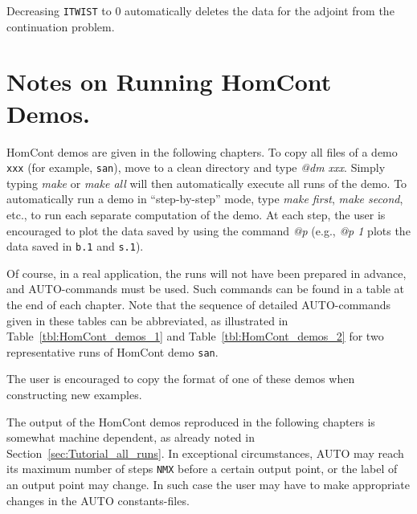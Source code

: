 \documentclass[12pt]{report}
\begin{document}
Decreasing {\tt ITWIST} to 0 automatically deletes the data for the adjoint
from the continuation problem.


\section{ Notes on Running {\cal HomCont} Demos.} \label{sec:HomCont_Tutorial_examples}
{\cal HomCont} demos are given in the following chapters.
To copy all files of a demo {\tt xxx} (for example, {\tt san}),
move to a clean directory and type {\it @dm xxx}.
Simply typing {\it make} or {\it make all} will then automatically
execute all runs of the demo.
To automatically run a demo in ``step-by-step'' mode,
type  {\it make first}, {\it make second}, etc.,
to run each separate computation of the demo. 
At each step, the user is encouraged to plot the data
saved by using the command {\it @p} (e.g., {\it @p 1} plots the data
saved in {\tt b.1} and {\tt s.1}).

Of course, in a real application, the runs will not have been prepared
in advance, and {\cal AUTO}-commands must be used.
Such commands can be found in a table at the end of each chapter.
Note that the sequence of detailed {\cal AUTO}-commands given in these tables
can be abbreviated, as illustrated in Table~\ref{tbl:HomCont_demos_1} 
and Table~\ref{tbl:HomCont_demos_2} for two representative runs of 
{\cal HomCont} demo {\tt san}.


The user is encouraged to copy the format of one of these demos
when constructing new examples.

The output of the {\cal HomCont} demos reproduced in  the following chapters
is somewhat machine dependent, as already noted 
in Section~\ref{sec:Tutorial_all_runs}.
In exceptional circumstances, {\cal AUTO} may reach its maximum number of
steps {\tt NMX} before a certain output point, or the label of
an output point may change. In such case the user may have
to make appropriate changes in the {\cal AUTO} constants-files.
\end{document}
